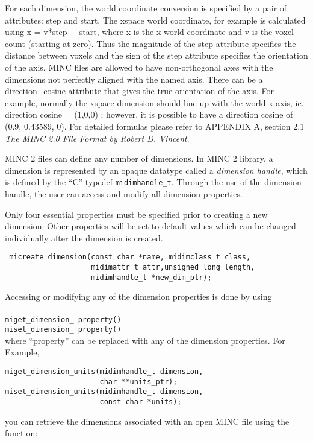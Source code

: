 \documentclass{article}
\begin{document}
For each dimension, the world  coordinate  conversion is specified  
by a pair of attributes: step and start. The xspace world coordinate, 
for example is calculated using x = v*step + start, where x is the x world 
coordinate and v is the voxel count (starting at zero). Thus the magnitude 
of the step attribute specifies the distance between voxels and the sign 
of the step attribute specifies the orientation of the axis. MINC files are 
allowed to have non-orthogonal axes with the dimensions not perfectly 
aligned with the named axis. There can be a direction\_cosine attribute that 
gives the true orientation of the axis. For example, normally the xspace 
dimension should line up with the world x axis, ie. direction cosine = (1,0,0)
; however, it is possible to have a direction cosine of (0.9, 0.43589, 0).
For detailed formulas please refer to APPENDIX A, section 2.1
\emph{The MINC 2.0 File Format by Robert D. Vincent}.

MINC 2 files can define any number of dimensions. In MINC 2 library, a dimension 
is represented by an opaque datatype
called a \emph{dimension handle}, which is defined by the ``C'' typedef
{\tt midimhandle\_t}. Through the use of the dimension handle, the user can access and 
modify all dimension properties. 

Only four essential properties must be specified prior to creating a new dimension. 
Other properties will be set to default values which can be 
changed individually after the dimension is created.
\begin{verbatim}
 micreate_dimension(const char *name, midimclass_t class, 
                    midimattr_t attr,unsigned long length, 
                    midimhandle_t *new_dim_ptr);
\end{verbatim}
Accessing or modifying any of the dimension properties is done by using \\
\\
{\tt miget\_dimension\_ property() }\\
{\tt miset\_dimension\_ property() } 
\\
where ``property'' can be replaced with any of the dimension properties. 
For Example,

\begin{verbatim}
miget_dimension_units(midimhandle_t dimension, 
                      char **units_ptr);
miset_dimension_units(midimhandle_t dimension, 
                      const char *units);
\end{verbatim}

you can retrieve the dimensions associated with an open MINC file using
the function:\\
\end{document}
